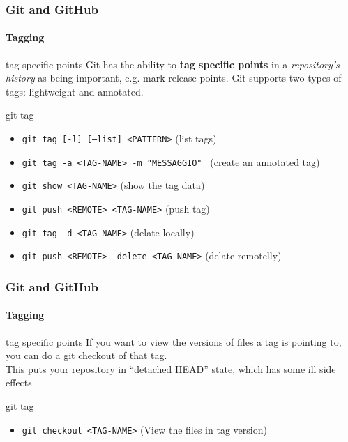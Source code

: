 \begin{frame}
	\frametitle{Git and GitHub}
    \framesubtitle{Tagging}
    \addtocounter{nframe}{1}

	\begin{block}{tag specific points}
		Git has the ability to \textbf{tag specific points} in a \textit{repository's history} as being important, e.g. mark release points. Git supports two types of tags: lightweight and annotated.
	\end{block}

	\begin{block}{git tag}
		\begin{itemize}
			\item \texttt{git tag [-l] [--list] <PATTERN>} (list tags)
			\item \texttt{git tag -a <TAG-NAME> -m "MESSAGGIO" } (create an annotated tag)
			\item \texttt{git show <TAG-NAME>} (show the tag data)
			\item \texttt{git push <REMOTE> <TAG-NAME>} (push tag)
			\item \texttt{git tag -d  <TAG-NAME>} (delate locally)
			\item \texttt{git push <REMOTE> --delete <TAG-NAME>} (delate remotelly)
		\end{itemize}
	\end{block}

\end{frame}

\begin{frame}
	\frametitle{Git and GitHub}
    \framesubtitle{Tagging}
    \addtocounter{nframe}{1}

	\begin{block}{tag specific points}
		If you want to view the versions of files a tag is pointing to, you can do a git checkout of that tag.\\
		This puts your repository in “detached HEAD” state, which has some ill side effects
	\end{block}

	\begin{block}{git tag}
		\begin{itemize}
			\item \texttt{git checkout <TAG-NAME>} (View the files in tag version)
		\end{itemize}
	\end{block}

\end{frame}

